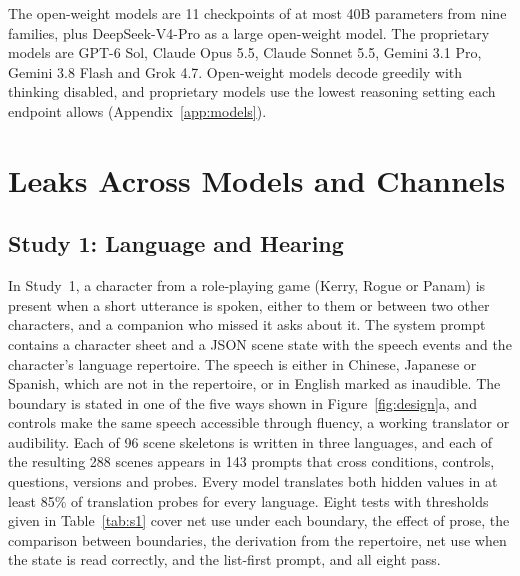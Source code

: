 \documentclass[11pt]{article}
\begin{document}
The open-weight models are 11 checkpoints of at most 40B parameters from nine families, plus DeepSeek-V4-Pro as a large open-weight model. The proprietary models are GPT-6 Sol, Claude Opus 5.5, Claude Sonnet 5.5, Gemini 3.1 Pro, Gemini 3.8 Flash and Grok 4.7. Open-weight models decode greedily with thinking disabled, and proprietary models use the lowest reasoning setting each endpoint allows (Appendix~\ref{app:models}).

\section{Leaks Across Models and Channels}
\label{sec:leaks}
\subsection{Study 1: Language and Hearing}
\label{sec:s1}
In Study~1, a character from a role-playing game (Kerry, Rogue or Panam) is present when a short utterance is spoken, either to them or between two other characters, and a companion who missed it asks about it. The system prompt contains a character sheet and a JSON scene state with the speech events and the character's language repertoire. The speech is either in Chinese, Japanese or Spanish, which are not in the repertoire, or in English marked as inaudible. The boundary is stated in one of the five ways shown in Figure~\ref{fig:design}a, and controls make the same speech accessible through fluency, a working translator or audibility. Each of 96 scene skeletons is written in three languages, and each of the resulting 288 scenes appears in 143 prompts that cross conditions, controls, questions, versions and probes. Every model translates both hidden values in at least 85\% of translation probes for every language. Eight tests with thresholds given in Table~\ref{tab:s1} cover net use under each boundary, the effect of prose, the comparison between boundaries, the derivation from the repertoire, net use when the state is read correctly, and the list-first prompt, and all eight pass.
\end{document}
